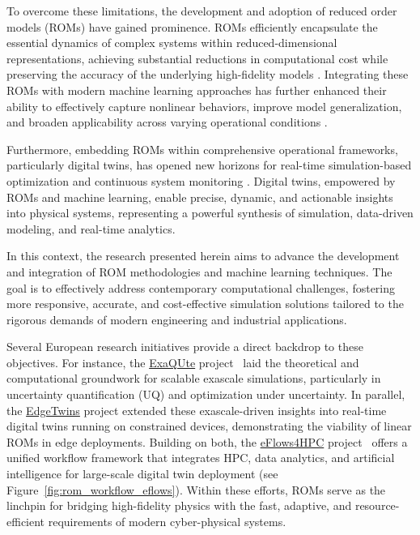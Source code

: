 To overcome these limitations, the development and adoption of reduced order models (ROMs) have gained prominence. ROMs efficiently encapsulate the essential dynamics of complex systems within reduced-dimensional representations, achieving substantial reductions in computational cost while preserving the accuracy of the underlying high-fidelity models \cite{quarteroni2015reduced}. Integrating these ROMs with modern machine learning approaches has further enhanced their ability to effectively capture nonlinear behaviors, improve model generalization, and broaden applicability across varying operational conditions \cite{lee2020model}.

Furthermore, embedding ROMs within comprehensive operational frameworks, particularly digital twins, has opened new horizons for real-time simulation-based optimization and continuous system monitoring \cite{kapteyn2022data}. Digital twins, empowered by ROMs and machine learning, enable precise, dynamic, and actionable insights into physical systems, representing a powerful synthesis of simulation, data-driven modeling, and real-time analytics.

In this context, the research presented herein aims to advance the development and integration of ROM methodologies and machine learning techniques. The goal is to effectively address contemporary computational challenges, fostering more responsive, accurate, and cost-effective simulation solutions tailored to the rigorous demands of modern engineering and industrial applications.

Several European research initiatives provide a direct backdrop to these objectives. For instance, the \href{https://cordis.europa.eu/project/id/800898}{ExaQUte} project~\cite{tosi2021parallel} laid the theoretical and computational groundwork for scalable exascale simulations, particularly in uncertainty quantification (UQ) and optimization under uncertainty. In parallel, the \href{https://cordis.europa.eu/project/id/946009}{EdgeTwins} project extended these exascale-driven insights into real-time digital twins running on constrained devices, demonstrating the viability of linear ROMs in edge deployments. Building on both, the \href{https://www.eflows4hpc.eu/}{eFlows4HPC} project~\cite{ejarque2022enabling} offers a unified workflow framework that integrates HPC, data analytics, and artificial intelligence for large-scale digital twin deployment (see Figure~\ref{fig:rom_workflow_eflows}). Within these efforts, ROMs serve as the linchpin for bridging high-fidelity physics with the fast, adaptive, and resource-efficient requirements of modern cyber-physical systems.

